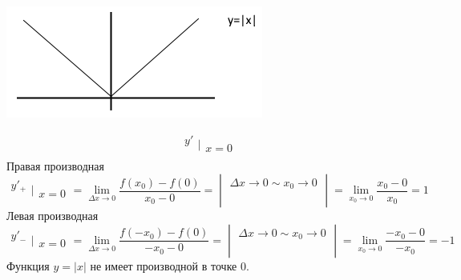 \documentclass[12pt]{article}
\begin{document}
    \begin{adjustwidth}{1.5em}{1.5em}
        \begin{center}
            \includegraphics{4.1.1.png}
        \end{center}
        \[ \begin{matrix}
            y'\\
            \\
        \end{matrix}\Big|\begin{matrix}
            \\
            x = 0
        \end{matrix} \]
        Правая производная
        \[ \begin{matrix}
            y'_+\\
            \\
        \end{matrix}\Big|\begin{matrix}
            \\
            x = 0
        \end{matrix} = \lim_{\Delta x \to 0}\frac{f(x_0) - f(0)}{x_0 - 0} = \begin{vmatrix}
            \Delta x \to 0 \sim x_0 \to 0\\
            \\
            \\
        \end{vmatrix} = \lim_{x_0 \to 0} \frac{x_0 - 0}{x_0} = 1 \]
        Левая производная
        \[ \begin{matrix}
            y'_-\\
            \\
        \end{matrix}\Big|\begin{matrix}
            \\
            x = 0
        \end{matrix} = \lim_{\Delta x \to 0}\frac{f(-x_0) - f(0)}{-x_0 - 0} = \begin{vmatrix}
            \Delta x \to 0 \sim x_0 \to 0\\
            \\
            \\
        \end{vmatrix} = \lim_{x_0 \to 0} \frac{-x_0 - 0}{-x_0} = -1 \]
        Функция $y = |x|$ не имеет производной в точке 0.
    \end{adjustwidth}
\end{document}
